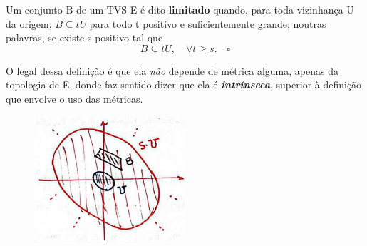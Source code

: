 \documentclass[../distribution_theory_notes.tex]{subfiles}
\begin{document}
    \begin{def*}
      Um conjunto B de um TVS E é dito \textbf{limitado} quando, para toda vizinhança U da origem, \(B\subseteq tU\) para todo t positivo e suficientemente grande; noutras palavras, se existe s positivo tal que 
        \[
          B\subseteq tU,\quad  \forall t\geq s.\quad \square
        \]
    \end{def*}
    O legal dessa definição é que ela \textit{não} depende de métrica alguma, apenas da topologia de E, donde faz sentido dizer que ela é \textbf{\textit{intrínseca}}, superior à definição que envolve o uso das métricas.
    \begin{figure}[H]
    \begin{center}
    \includegraphics[height=0.5\textheight, width=0.5\textwidth, keepaspectratio]{./Images/bounded_set_03.png}
    \end{center}
    \end{figure}
\end{document}
